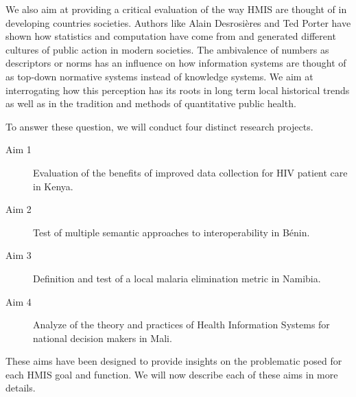 We also aim at providing a critical evaluation of the way HMIS are thought of in developing countries societies. Authors like Alain Desrosières and Ted Porter have shown how statistics and computation have come from and generated different cultures of public action in modern societies. The ambivalence of numbers as descriptors or norms has an influence on how information systems are thought of as top-down normative systems instead of knowledge systems. We aim at interrogating how this perception has its roots in long term local historical trends as well as in the tradition and methods of quantitative public health.


To answer these question, we will conduct four distinct research projects.
\begin{description}
	\item[Aim 1] Evaluation of the benefits of improved data collection for HIV patient care in Kenya.
	\item[Aim 2] Test of multiple semantic approaches to interoperability in Bénin.
	\item[Aim 3] Definition and test of a local malaria elimination metric in Namibia.
	\item[Aim 4] Analyze of the theory and practices of Health Information Systems for national decision makers in Mali.
\end{description}

These aims have been designed to provide insights on the problematic posed for each HMIS goal and function. We will now describe each of these aims in more details.
